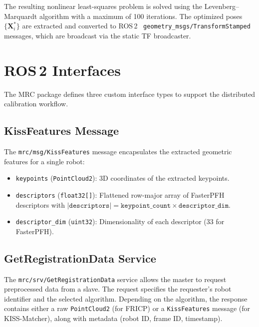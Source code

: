 The resulting nonlinear least-squares problem is solved using the
Levenberg--Marquardt algorithm with a maximum of 100 iterations.
The optimized poses $\{\mathbf{X}_i^*\}$ are extracted and converted to
ROS\,2  \
\texttt{geometry\_msgs/TransformStamped} messages, which are
broadcast via the static TF broadcaster.

\section{ROS\,2 Interfaces}
\label{sec:ros2_interfaces}

The MRC package defines three custom interface types to support
the distributed calibration workflow.

\subsection{KissFeatures Message}

The \texttt{mrc/msg/KissFeatures} message encapsulates the extracted
geometric features for a single robot:

\begin{itemize}
    \item \texttt{keypoints} (\texttt{PointCloud2}): 3D coordinates of the
          extracted keypoints.
    \item \texttt{descriptors} (\texttt{float32[]}): Flattened row-major array
          of FasterPFH descriptors with
          $|\texttt{descriptors}| = \texttt{keypoint\_count} \times \texttt{descriptor\_dim}$.
    \item \texttt{descriptor\_dim} (\texttt{uint32}): Dimensionality of each
          descriptor (33 for FasterPFH).
\end{itemize}

\subsection{GetRegistrationData Service}

The \texttt{mrc/srv/GetRegistrationData} service allows the master to request
preprocessed data from a slave.
The request specifies the requester's robot identifier and the selected
algorithm.
Depending on the algorithm, the response contains either a raw
\texttt{PointCloud2} (for FRICP) or a \texttt{KissFeatures} message
(for KISS-Matcher), along with metadata (robot ID, frame ID, timestamp).

